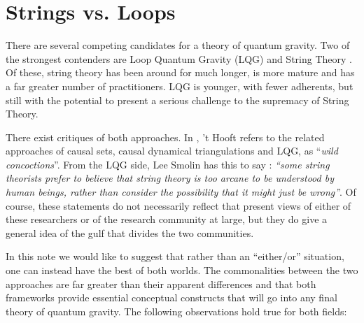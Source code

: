 \documentclass{ws-mpla}
\begin{document}
\section{Strings vs. Loops}\label{sec:comparison}

There are several competing candidates for a theory of quantum gravity. Two of the strongest contenders are Loop Quantum Gravity (LQG) \cite{Ashtekar1991Lectures,Ashtekar2004Background,Rovelli2011Zakopane} and String Theory \cite{Tong2010Lectures,Zwiebach2009A-First,Polchinski1998aString}. Of these, string theory has been around for much longer, is more mature and has a far greater number of practitioners. LQG is younger, with fewer adherents, but still with the potential to present a serious challenge to the supremacy of String Theory.

There exist critiques of both approaches. In \cite[Sec. 4, pg 6]{t-Hooft2016Natures}, 't Hooft refers to the related approaches of causal sets, causal dynamical triangulations and LQG, as ``\emph{wild concoctions}''. From the LQG side, Lee Smolin has this to say \cite{Smolin2006The-trouble}: \emph{``some string theorists prefer to believe that string theory is too arcane to be understood by human beings, rather than consider the possibility that it might just be wrong''}. Of course, these statements do not necessarily reflect that present views of either of these researchers or of the research community at large, but they do give a general idea of the gulf that divides the two communities.

In this note we would like to suggest that rather than an ``either/or'' situation, one can instead have the best of both worlds. The commonalities between the two approaches are far greater than their apparent differences and that both frameworks provide essential conceptual constructs that will go into any final theory of quantum gravity. The following observations hold true for both fields:
\end{document}
